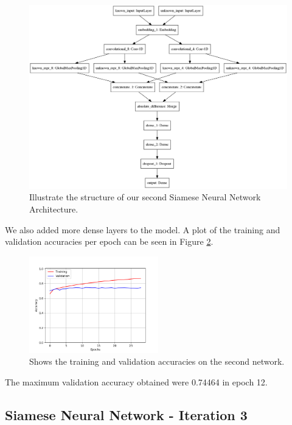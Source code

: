 \begin{figure}
    \centering
    \includegraphics[width=\textwidth]{./pictures/method/network2.png}
    \caption{Illustrate the structure of our second Siamese Neural Network
        Architecture.}
    \label{fig:network_2}
\end{figure}

We also added more dense layers to the model. A plot of the
training and validation accuracies per epoch can be seen in Figure
\ref{fig:network2_accuracies}.

\begin{figure}
    \centering
    \includegraphics[width=0.5\textwidth]{./pictures/method/network_2_accuracies.png}
    \caption{Shows the training and validation accuracies on the second
        network.}
    \label{fig:network2_accuracies}
\end{figure}

The maximum validation accuracy obtained were 0.74464 in epoch 12.


\subsection{Siamese Neural Network - Iteration 3}

